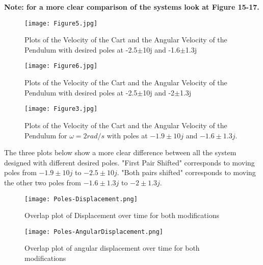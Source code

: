 \documentclass[11pt, twoside, letterpaper]{article}   	%
\begin{document}
\textbf{Note: for a more clear comparison of the systems look at Figure 15-17.}


\begin{figure}[htbp]
\begin{center}
\texttt{[image: Figure5.jpg]}
\caption{Plots of the Velocity of the Cart and the Angular Velocity of the Pendulum with desired poles at -2.5$\pm$10j and -1.6$\pm$1.3j}
\label{default}
\end{center}
\end{figure}
\FloatBarrier

\begin{figure}[htbp]
\begin{center}
\texttt{[image: Figure6.jpg]}
\caption{Plots of the Velocity of the Cart and the Angular Velocity of the Pendulum with desired poles at -2.5$\pm$10j and -2$\pm$1.3j}
\label{default}
\end{center}
\end{figure}
\FloatBarrier

\begin{figure}[htbp]
\begin{center}
\texttt{[image: Figure3.jpg]}
\caption{Plots of the Velocity of the Cart and the Angular Velocity of the Pendulum for $\omega = 2 rad/s$ with poles at $-1.9\pm10j$ and $-1.6\pm1.3j$.}
\label{default}
\end{center}
\end{figure}
\FloatBarrier

The three plots below show a more clear difference between all the system designed with different 
desired poles. "First Pair Shifted" corresponds to moving poles from $-1.9\pm10j$ to $-2.5\pm10j$.
"Both pairs shifted" corresponds to moving the other two poles from $-1.6\pm1.3j$ to $-2\pm1.3j$.

\begin{figure}[htbp]
\begin{center}
\texttt{[image: Poles-Displacement.png]}
\caption{Overlap plot of Displacement over time for both modifications}
\label{default}
\end{center}
\end{figure}
\FloatBarrier

\begin{figure}[htbp]
\begin{center}
\texttt{[image: Poles-AngularDisplacement.png]}
\caption{Overlap plot of angular displacement over time for both modifications}
\label{default}
\end{center}
\end{figure}
\FloatBarrier
\end{document}
